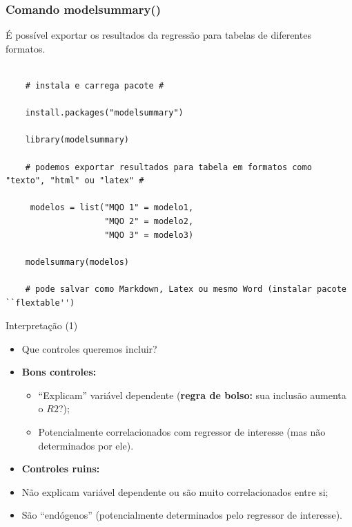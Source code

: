 \documentclass[10pt,slides,xcolor=pdftex,dvipsnames,table]{beamer}
\begin{document}

\begin{frame}[fragile]
	\frametitle{Comando modelsummary()}

\vspace{0.5cm}
É possível exportar os resultados da regressão para tabelas de diferentes formatos.

\begin{lstlisting}

	# instala e carrega pacote #
	
	install.packages("modelsummary")
	
	library(modelsummary)	

    # podemos exportar resultados para tabela em formatos como "texto", "html" ou "latex" # 
    
	 modelos = list("MQO 1" = modelo1,
               		"MQO 2" = modelo2,
               		"MQO 3" = modelo3)

	modelsummary(modelos)
    
    # pode salvar como Markdown, Latex ou mesmo Word (instalar pacote ``flextable'') 

\end{lstlisting}

\end{frame}


\begin{frame}{Interpretação (1)}
    
     \begin{itemize}\itemsep1.2em   
     
     \item Que controles queremos incluir?
     
     \item \textbf{Bons controles:}
     
     \begin{itemize}
     \item ``Explicam'' variável dependente (\textbf{regra de bolso:} sua inclusão aumenta o $R2$?);     
     
     \item Potencialmente correlacionados com regressor de interesse (mas não determinados por ele). 
     
     \end{itemize}
     
     \item \textbf{Controles ruins:}
     
     \item Não explicam variável dependente ou são muito correlacionados entre si;
     
     \item São ``endógenos'' (potencialmente determinados pelo regressor de interesse).
     
    \end{itemize}
    
\end{frame}
\end{document}
